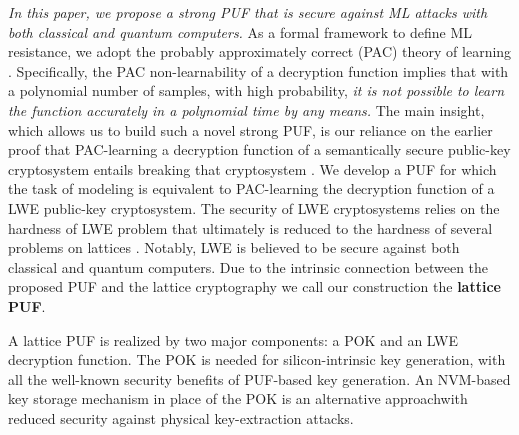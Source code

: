 \emph{In this paper, we propose a strong PUF that is secure against ML attacks with both classical and quantum computers.} \cite{wang2020lattice} 
As a formal framework to define ML resistance, we adopt the probably approximately correct (PAC) theory of learning \cite{mohri2012foundations}. 
Specifically, the PAC non-learnability of a decryption function implies that with a polynomial number of samples, with high probability, \emph{it is not possible to learn the function accurately in a polynomial time by any means.}
The main insight, which allows us to build such a novel strong PUF, is our reliance on the earlier proof that PAC-learning a decryption function of a semantically secure public-key cryptosystem entails breaking that cryptosystem %
\cite{kearns1994cryptographic, klivans2006cryptographic}.
We develop a PUF for which the task of modeling is equivalent to PAC-learning the decryption function of a LWE public-key cryptosystem.
The security of LWE cryptosystems relies on the hardness of LWE problem that ultimately is reduced to the hardness of several problems on lattices \cite{regev2009lattices}. 
Notably, LWE is believed to be secure against both classical and quantum computers.
Due to the intrinsic connection between the proposed PUF and the lattice cryptography we call our construction the \textbf{lattice PUF}.

\DIFdelbegin %

\DIFdelend A lattice PUF is realized by two major components: a POK and an LWE decryption function. 
The POK is needed for silicon-intrinsic key generation, with all the well-known security benefits of PUF-based key generation. 
\DIFdelbegin \DIFdel{(}\DIFdelend An NVM-based key storage mechanism in place of the POK is an alternative approach\DIFdelbegin {}\DIFdelend \DIFaddbegin {}\DIFaddend with reduced security against physical key-extraction attacks.
\DIFdelbegin \DIFdel{)
}%

